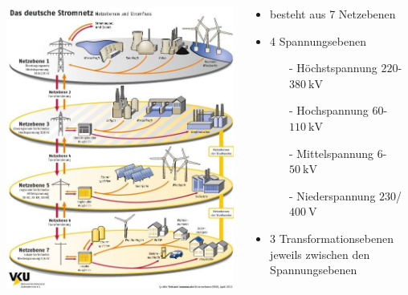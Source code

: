 \documentclass[aspectratio=1610, professionalfonts, 9pt]{beamer}
\begin{document}
{
\begin{frame}
  \begin{columns}
\begin{column}{0.5\textwidth}
\includegraphics[width=1\textwidth]{images/netzebenen.jpg}
\end{column}
\begin{column}{0.5\textwidth}
  \begin{itemize}
    \item besteht aus \num{7} Netzebenen
    \item \num{4} Spannungsebenen
    \begin{itemize}
      \item[-] Höchstspannung $\num{220}$-$\SI{380}{\kilo\volt}$
      \item[-] Hochspannung  $\num{60}$-$\SI{110}{\kilo\volt}$
      \item[-] Mittelspannung  $\num{6}$-$\SI{50}{\kilo\volt}$
      \item[-] Niederspannung $\num{230}$/$\SI{400}{\volt}$
    \end{itemize}
    \item \num{3} Transformationsebenen jeweils zwischen den Spannungsebenen
  \end{itemize}
\end{column}
\end{columns}
\end{frame}
}
\end{document}
